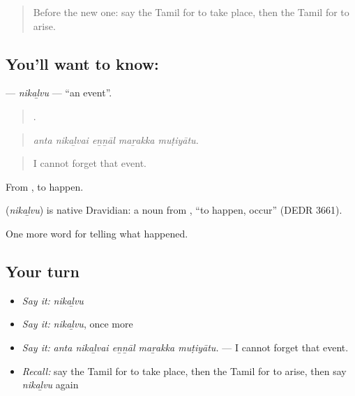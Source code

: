 \label{lesson:TA-C315-nikalvu}



\begin{quote}
Before the new one: say the Tamil for to take place, then the Tamil for to arise.
\end{quote}

\subsection*{You'll want to know: }
\textbf{} — \emph{nikaḻvu} — \textquotedblleft{}an event\textquotedblright{}.

\begin{quote}
    .
\end{quote}

\begin{quote}
\emph{anta nikaḻvai eṉṉāl maṟakka muṭiyātu.}
\end{quote}

\begin{quote}
I cannot forget that event.
\end{quote}

From , to happen.

\begin{cousinweb}
\textbf{} (\emph{nikaḻvu}) is native Dravidian: a noun from , \textquotedblleft{}to happen, occur\textquotedblright{} (DEDR 3661).
\end{cousinweb}

\begin{grammarlens}[title={What you've built}]
One more word for telling what happened.
\end{grammarlens}

\subsection*{Your turn}
\begin{itemize}
\raggedright
  \item \emph{Say it:} \emph{nikaḻvu}
  \item \emph{Say it:} \emph{nikaḻvu}, once more
  \item \emph{Say it:} \emph{anta nikaḻvai eṉṉāl maṟakka muṭiyātu.} — I cannot forget that event.
  \item \emph{Recall:} say the Tamil for to take place, then the Tamil for to arise, then say \emph{nikaḻvu} again
\end{itemize}

